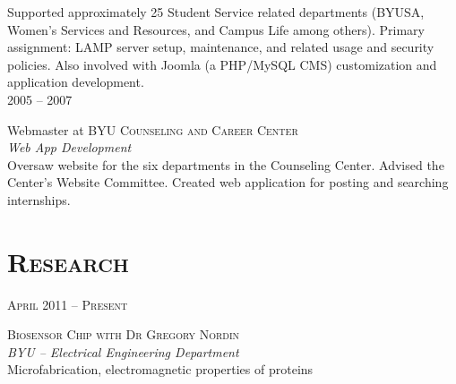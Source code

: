 \documentclass[10pt]{article}
\begin{document}
{\begin{minipage}[t]{0.5\textwidth}
	\normalsize{
  Supported approximately 25 Student Service related departments (BYUSA, Women's Services and Resources, and Campus Life among others). 
  Primary assignment: LAMP server setup, maintenance, and related usage and security policies. 
  Also involved with Joomla (a PHP/MySQL CMS) customization and application development. 
  }\\[10pt]

	\raggedleft
	\textsc{\normalsize 2005 -- 2007}\par

	\raggedright\large Webmaster at \textsc{BYU Counseling and Career Center}\\
	\emph{Web App Development}\\[5pt]

	\normalsize{
  Oversaw website for the six departments in the Counseling Center.
  Advised the Center's Website Committee.
  Created web application for posting and searching internships.
  }\\[10pt]

%	
%
\section{\textsc{Research}}

	\raggedleft
	\textsc{\normalsize April 2011 -- Present}\par

	\raggedright\large \textsc{Biosensor Chip with Dr Gregory Nordin}\\
  \emph{BYU -- Electrical Engineering Department}\\[5pt]
  \normalsize{Microfabrication, electromagnetic properties of proteins 
  }\\[10pt]


\end{minipage}}
\end{document}
